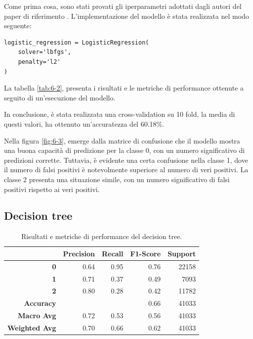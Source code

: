Come prima cosa, sono stati provati gli iperparametri adottati dagli autori del paper di riferimento \cite{iqbal2022exploring}. L'implementazione del modello è stata realizzata nel modo seguente:

\bigskip

\begin{lstlisting}
logistic_regression = LogisticRegression(
    solver='lbfgs',
    penalty='l2'
)
\end{lstlisting}

\bigskip

La tabella \ref{tab:6-2}, presenta i risultati e le metriche di performance ottenute a seguito di un'esecuzione del modello.

\bigskip

In conclusione, è stata realizzata una cross-validation su 10 fold, la media di questi valori, ha ottenuto un'accuratezza del 60.18\%.

\bigskip

Nella figura \ref{fig:6-3}, emerge dalla matrice di confusione che il modello mostra una buona capacità di predizione per la classe 0, con un numero significativo di predizioni corrette. Tuttavia, è evidente una certa confusione nella classe 1, dove il numero di falsi positivi è notevolmente superiore al numero di veri positivi. La classe 2 presenta una situazione simile, con un numero significativo di falsi positivi rispetto ai veri positivi.

\subsection{Decision tree}

\begin{table}[t]
    \centering
    \begin{tabular}{|r|rrrr|}
    \hline
    & \textbf{Precision}
    & \textbf{Recall}
    & \textbf{F1-Score}
    & \textbf{Support} \\
    \hline
    \textbf{0}
    & 0.64
    & 0.95
    & 0.76
    & 22158 \\
    \textbf{1}
    & 0.71
    & 0.37
    & 0.49
    & 7093 \\
    \textbf{2}
    & 0.80
    & 0.28
    & 0.42
    & 11782 \\
    \textbf{Accuracy}
    &
    &
    & 0.66
    & 41033 \\
    \textbf{Macro Avg}
    & 0.72
    & 0.53
    & 0.56
    & 41033 \\
    \textbf{Weighted Avg}
    & 0.70
    & 0.66
    & 0.62
    & 41033 \\
    \hline
    \end{tabular}
    \caption{Risultati e metriche di performance del decision tree.}
    \label{tab:6-3}
\end{table}


